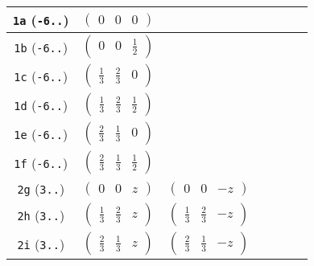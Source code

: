 \documentclass[fleqn,9pt,landscape]{jsarticle}
\begin{document}
\begin{center}
\begin{longtable}{ccccccc}
{\tt 1a} ({\tt -6..}) & $ \begin{pmatrix} 0 & 0 & 0 \end{pmatrix} $ & $  $ & $  $ & $  $ & $  $ & $  $ \\ \hline
{\tt 1b} ({\tt -6..}) & $ \begin{pmatrix} 0 & 0 & \frac{1}{2} \end{pmatrix} $ & $  $ & $  $ & $  $ & $  $ & $  $ \\ \hline
{\tt 1c} ({\tt -6..}) & $ \begin{pmatrix} \frac{1}{3} & \frac{2}{3} & 0 \end{pmatrix} $ & $  $ & $  $ & $  $ & $  $ & $  $ \\ \hline
{\tt 1d} ({\tt -6..}) & $ \begin{pmatrix} \frac{1}{3} & \frac{2}{3} & \frac{1}{2} \end{pmatrix} $ & $  $ & $  $ & $  $ & $  $ & $  $ \\ \hline
{\tt 1e} ({\tt -6..}) & $ \begin{pmatrix} \frac{2}{3} & \frac{1}{3} & 0 \end{pmatrix} $ & $  $ & $  $ & $  $ & $  $ & $  $ \\ \hline
{\tt 1f} ({\tt -6..}) & $ \begin{pmatrix} \frac{2}{3} & \frac{1}{3} & \frac{1}{2} \end{pmatrix} $ & $  $ & $  $ & $  $ & $  $ & $  $ \\ \hline
{\tt 2g} ({\tt 3..}) & $ \begin{pmatrix} 0 & 0 & z \end{pmatrix} $ & $ \begin{pmatrix} 0 & 0 & - z \end{pmatrix} $ & $  $ & $  $ & $  $ & $  $ \\ \hline
{\tt 2h} ({\tt 3..}) & $ \begin{pmatrix} \frac{1}{3} & \frac{2}{3} & z \end{pmatrix} $ & $ \begin{pmatrix} \frac{1}{3} & \frac{2}{3} & - z \end{pmatrix} $ & $  $ & $  $ & $  $ & $  $ \\ \hline
{\tt 2i} ({\tt 3..}) & $ \begin{pmatrix} \frac{2}{3} & \frac{1}{3} & z \end{pmatrix} $ & $ \begin{pmatrix} \frac{2}{3} & \frac{1}{3} & - z \end{pmatrix} $ & $  $ & $  $ & $  $ & $  $ \\ \hline

\end{longtable}
\end{center}
\end{document}
